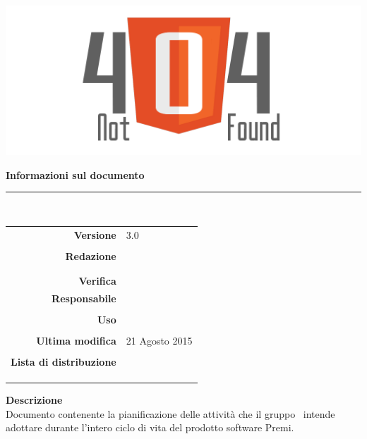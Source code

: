 \thispagestyle{empty}

\begin{titlepage}
	
	\begin{center}
	\begin{Huge}
		\textbf{\gruppo} \\
	\end{Huge}
	\vspace{0.5cm}
	\begin{Large}
		\textbf{\capitolato}
	\end{Large}
	
	\vspace{1cm}
    
	\includegraphics[scale=0.35]{../logo/logo404_Extends.png}
	\vspace{1cm}
	\begin{Huge}
		\textbf{\titDoc}
	\end{Huge}
	
	\vspace{1cm}
	\textbf{Informazioni sul documento}\\
    \rule{10cm}{.4pt} \\
	\begin{table}[h]
	\begin{center}
	\begin{tabular}{r | l}
		\textbf{Versione} & 3.0 \\ \\
		\textbf{Redazione} & \MaMo \\ & \GoIs \\ \\
		\textbf{Verifica} & \DeEn \\
		\textbf{Responsabile} & \CoMa \\ \\
		\textbf{Uso} & \uso \\ \\
		\textbf{Ultima modifica} & 21 Agosto 2015 \\ \\
		\textbf{Lista di distribuzione} & \gruppo \\ 
					& \Vardanega \\
					& \Cardin \\
					& \Zucchetti \\
	\end{tabular}
	\end{center}
	\end{table}
			\textbf{Descrizione} \\
Documento contenente la pianificazione delle attività che il gruppo \gruppo\ intende adottare durante l'intero ciclo di vita del prodotto software Premi.
	\end{center}
\end{titlepage}